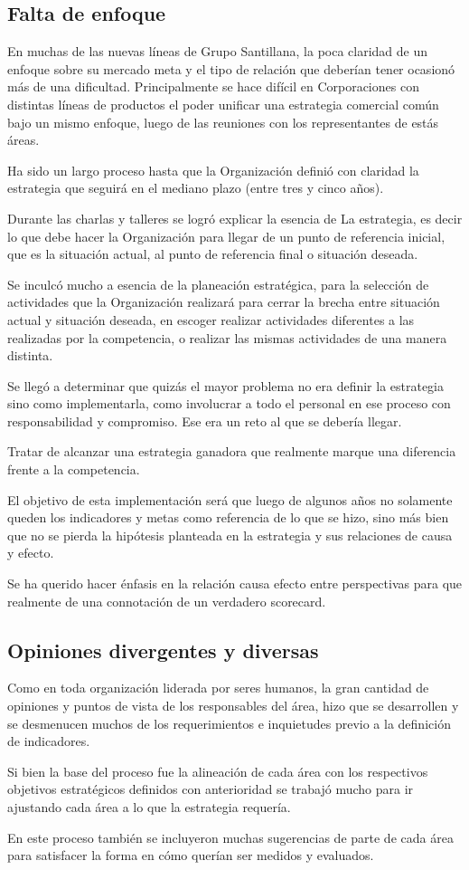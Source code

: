 \subsection{Falta de enfoque}
\item {En muchas de las nuevas líneas de Grupo Santillana, la poca claridad de un enfoque sobre su mercado meta y el tipo de relación que deberían tener ocasionó más de una dificultad. Principalmente se hace difícil en Corporaciones con distintas líneas de productos el poder unificar una estrategia comercial común bajo un mismo enfoque, luego de las reuniones con los representantes de estás áreas.

Ha sido un largo proceso hasta que la Organización definió con claridad la estrategia que seguirá en el mediano plazo (entre tres y cinco años).

Durante las charlas y talleres se logró explicar la esencia de La estrategia,  es decir lo que debe hacer la Organización para llegar de un punto de referencia inicial, que es la situación actual, al punto de referencia final o situación deseada.

Se inculcó mucho a esencia de la planeación estratégica, para la selección de actividades que la Organización realizará para cerrar la brecha entre situación actual y situación deseada, en escoger realizar actividades diferentes a las realizadas por la competencia, o realizar las mismas actividades de una manera distinta.

Se llegó a determinar que quizás el mayor problema no era definir la estrategia sino como implementarla, como involucrar a todo el personal en ese proceso con responsabilidad y compromiso. Ese era un reto al que se debería llegar.

Tratar de alcanzar una estrategia ganadora que realmente marque una diferencia frente a la competencia.

El objetivo de esta implementación será que luego de algunos años no solamente queden los indicadores y metas como referencia de lo que se hizo, sino más bien que no se pierda la hipótesis planteada en la estrategia y sus relaciones de causa y efecto.

Se ha querido hacer énfasis en la relación causa efecto entre perspectivas para que realmente de una connotación de un verdadero scorecard.}

\subsection{Opiniones divergentes y diversas}
\item {Como en toda organización liderada por seres humanos, la gran cantidad de opiniones y puntos de vista de los responsables del área, hizo que se desarrollen y se desmenucen muchos de los requerimientos e inquietudes previo a la definición de indicadores.

Si bien la base del proceso fue la alineación de cada área con los respectivos objetivos estratégicos definidos con anterioridad se trabajó mucho para ir ajustando cada área a lo que la estrategia requería.

En este proceso también se incluyeron muchas sugerencias de parte de cada área para satisfacer la forma en cómo querían ser medidos y evaluados.}


